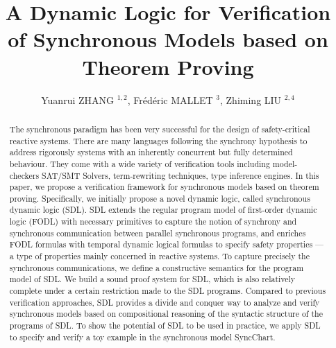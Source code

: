 \documentclass{fcs}
\title{A Dynamic Logic for Verification of Synchronous Models based on Theorem Proving}
\author{Yuanrui ZHANG $^{1,2}$, Fr\'ed\'eric MALLET $^{3}$, Zhiming LIU \xff $^{2,4}$}
\begin{document}
\maketitle
\setcounter{page}{1}
\setlength{\baselineskip}{14pt}


\begin{abstract}
  The synchronous paradigm has been very successful for the design of safety-critical reactive systems. 
  There are many languages following the synchrony hypothesis to address rigorously systems with an inherently concurrent but fully determined behaviour. 
  They come with a wide variety of verification tools including model-checkers SAT/SMT Solvers, term-rewriting techniques, type inference engines. 
  In this paper, we propose a verification framework for synchronous models based on theorem proving.
  Specifically, we initially propose a novel dynamic logic, called synchronous dynamic logic (SDL).
  SDL extends the regular program model of first-order dynamic logic (FODL) with necessary primitives to capture the notion of synchrony and synchronous communication between parallel synchronous programs, and
  enriches FODL formulas with temporal dynamic logical formulas to specify safety properties --- a type of properties mainly concerned in reactive systems.
  To capture precisely the synchronous communications, we define a constructive semantics for the program model of SDL.
  We build a sound proof system for SDL, which is also relatively complete under a certain restriction made to the SDL programs.
  Compared to previous verification approaches, SDL provides a divide and conquer way to analyze and verify synchronous models based on compositional reasoning of the syntactic structure of the programs of SDL.
  To show the potential of SDL to be used in practice, we apply SDL to specify and verify a toy example in the synchronous model SyncChart.
\end{abstract}



\end{document}
